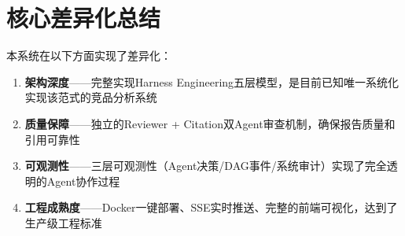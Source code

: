 \documentclass[12pt,a4paper]{ctexrep}
\begin{document}
\section{核心差异化总结}

本系统在以下方面实现了差异化：

\begin{enumerate}
\item \textbf{架构深度}——完整实现Harness Engineering五层模型，是目前已知唯一系统化实现该范式的竞品分析系统
\item \textbf{质量保障}——独立的Reviewer + Citation双Agent审查机制，确保报告质量和引用可靠性
\item \textbf{可观测性}——三层可观测性（Agent决策/DAG事件/系统审计）实现了完全透明的Agent协作过程
\item \textbf{工程成熟度}——Docker一键部署、SSE实时推送、完整的前端可视化，达到了生产级工程标准
\end{enumerate}
\end{document}

